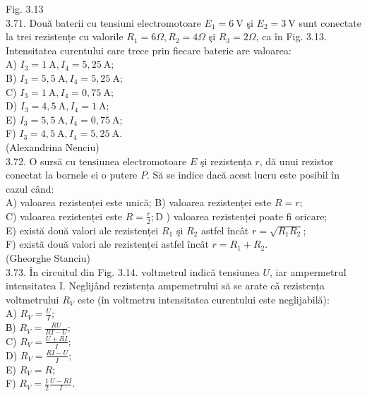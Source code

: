 \documentclass[10pt]{article}
\begin{document}
Fig. 3.13\\
3.71. Două baterii cu tensiuni electromotoare $E_{1}=6 \mathrm{~V}$ şi $E_{2}=3 \mathrm{~V}$ sunt conectate la trei rezistențe cu valorile $R_{1}=6 \Omega, R_{2}=4 \Omega$ şi $R_{3}=2 \Omega$, ca în Fig. 3.13. Intensitatea curentului care trece prin fiecare baterie are valoarea:\\
A) $I_{3}=1 \mathrm{~A}, I_{4}=5,25 \mathrm{~A}$;\\
B) $I_{3}=5,5 \mathrm{~A}, I_{4}=5,25 \mathrm{~A}$;\\
C) $I_{3}=1 \mathrm{~A}, I_{4}=0,75 \mathrm{~A}$;\\
D) $I_{3}=4,5 \mathrm{~A}, I_{4}=1 \mathrm{~A}$;\\
E) $I_{3}=5,5 \mathrm{~A}, I_{4}=0,75 \mathrm{~A}$;\\
F) $I_{3}=4,5 \mathrm{~A}, I_{4}=5,25 \mathrm{~A}$.\\
(Alexandrina Nenciu)\\
3.72. O sursă cu tensiunea electromotoare $E$ şi rezistența $r$, dă unui rezistor conectat la bornele ei o putere $P$. Să se indice dacă acest lucru este posibil în cazul când:\\
A) valoarea rezistenței este unică; B) valoarea rezistenței este $R=r$;\\
C) valoarea rezistenței este $R=\frac{r}{2} ; \mathrm{D}$ ) valoarea rezistenței poate fi oricare;\\
E) există două valori ale rezistenței $R_{1}$ şi $R_{2}$ astfel încât $r=\sqrt{R_{1} R_{2}}$;\\
F) există două valori ale rezistenței astfel încât $r=R_{1}+R_{2}$.\\
(Gheorghe Stanciu)\\
3.73. În circuitul din Fig. 3.14. voltmetrul indică tensiunea $U$, iar ampermetrul intensitatea I. Neglijând rezistența ampemetrului să se arate cǎ rezistența voltmetrului $R_{V}$ este (în voltmetru intensitatea curentului este neglijabilă):\\
A) $R_{V}=\frac{U}{I}$;\\
В) $R_{V}=\frac{R U}{R I-U}$;\\
C) $R_{V}=\frac{U+R I}{I}$;\\
D) $R_{V}=\frac{R I-U}{I}$;\\
E) $R_{V}=R$;\\
F) $R_{V}=\frac{1}{2} \frac{U-R I}{I}$.\\
\end{document}
